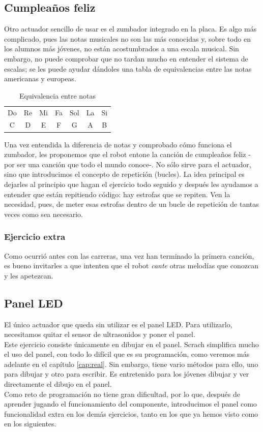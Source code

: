 \subsection{Cumpleaños feliz}\label{ej:cumple}
Otro actuador sencillo de usar es el zumbador integrado en la placa. Es algo más complicado, pues las notas musicales no son las más conocidas y, sobre todo en los alumnos más jóvenes, no están acostumbrados a una escala musical. Sin embargo, no puede comprobar que no tardan mucho en entender el sistema de escalas; se les puede ayudar dándoles una tabla de equivalencias entre las notas americanas y europeas.\\
\begin{table}[H]\centering
	\begin{tabular}{||ccccccc||}
		\hline
		Do & Re & Mi & Fa & Sol & La & Si \\[1.5pt]
		C & D & E & F & G & A & B \\
		\hline
		
	\end{tabular}
	\caption{Equivalencia entre notas}
\end{table}

Una vez entendida la diferencia de notas y comprobado cómo funciona el zumbador, les proponemos que el robot entone la canción de cumpleaños feliz -por ser una canción que todo el mundo conoce-. No sólo sirve para el actuador, sino que introducimos el concepto de repetición (bucles). La idea principal es dejarles al principio que hagan el ejercicio todo seguido y después les ayudamos a entender que están repitiendo código: hay estrofas que se repiten. Ven la necesidad, pues, de meter esas estrofas dentro de un bucle de repetición de tantas veces como sea necesario.\\
\subsubsection{Ejercicio extra}
Como ocurrió antes con las carreras, una vez han terminado la primera canción, es bueno invitarles a que intenten que el robot \textit{cante} otras melodías que conozcan y les apetezcan. 
\subsection{Panel LED}\label{ej:panelLed}
El único actuador que queda sin utilizar es el panel LED. Para utilizarlo, necesitamos quitar el sensor de ultrasonidos y poner el panel.\\
Este ejercicio consiste únicamente en dibujar en el panel. Scrach simplifica mucho el uso del panel, con todo lo difícil que es su programación, como veremos más adelante en el capítulo \ref{cap:real}. Sin embargo, tiene vario métodos para ello, uno para dibujar y otro para escribir. Es entretenido para los jóvenes dibujar y ver directamente el dibujo en el panel. \\
Como reto de programación no tiene gran dificultad, por lo que, después de aprender jugando el funcionamiento del componente, introducimos el panel como funcionalidad extra en los demás ejercicios, tanto en los que ya hemos visto como en los siguientes. 
